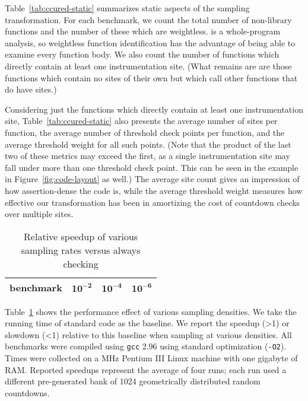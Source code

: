 Table~\ref{tab:ccured-static} summarizes static aspects of the
sampling transformation.  For each benchmark, we count the total
number of non-library functions and the number of these which are
weightless.  \ccured is a whole-program analysis, so weightless
function identification has the advantage of being able to examine
every function body.  We also count the number of functions which
directly contain at least one instrumentation site.  (What remains are
are those functions which contain no sites of their own but which call
other functions that do have sites.)

Considering just the functions which directly contain at least one
instrumentation site, Table~\ref{tab:ccured-static} also presents the
average number of sites per function, the average number of threshold
check points per function, and the average threshold weight for all
such points.  (Note that the product of the last two of these metrics
may exceed the first, as a single instrumentation site may fall under
more than one threshold check point.  This can be seen in the example
in Figure~\ref{fig:code-layout} as well.)  The average site count
gives an impression of how assertion-dense the code is, while the
average threshold weight measures how effective our transformation has
been in amortizing the cost of countdown checks over multiple sites.

\begin{table}
  \centering
  \begin{tabular}{|l|rrr|}
    \hline
    \rule{0pt}{2.5ex}
    \textbf{benchmark} & $\mathbf{10^{-2}}$ & $\mathbf{10^{-4}}$ & $\mathbf{10^{-6}}$ \\
    \hline\hline
    
    \hline
    
    \hline
  \end{tabular}
  \caption{Relative speedup of various sampling rates versus always checking}
  \label{tab:ccured-density}
\end{table}

Table~\ref{tab:ccured-density} shows the performance effect of various
sampling densities.  We take the running time of standard \ccured code
as the baseline.  We report the speedup (>1) or slowdown (<1) relative
to this baseline when sampling at various densities.  All benchmarks
were compiled using \texttt{gcc} 2.96 using standard optimization
(\texttt{-O2}).  Times were collected on a \unknown MHz Pentium III
Linux machine with one gigabyte of RAM.  Reported speedups represent
the average of four runs; each run used a different pre-generated bank
of 1024 geometrically distributed random countdowns.

